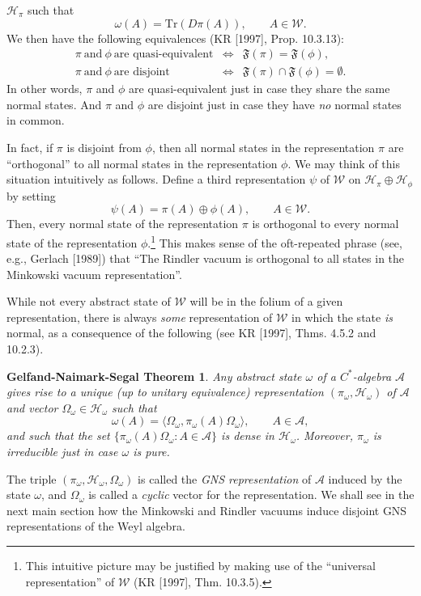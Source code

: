 \documentclass[12pt]{article}
\newtheorem*{gns}{Gelfand-Naimark-Segal Theorem}
\theoremstyle{remark}
\theoremstyle{definition}
\newcommand{\alg}[1]{\mathcal{#1}}
\newcommand{\hil}[1]{\mathcal{#1}}
\begin{document}
$\hil{H}_{\pi}$ such that \begin{equation} \omega (A)=\mathrm{Tr}(D\pi
  (A)) ,\qquad A\in \alg{W} .\end{equation} We then have the following
equivalences (KR [1997], Prop. 10.3.13):
\begin{eqnarray} \nonumber
\pi\ \mbox{and}\ \phi\ \mbox{are quasi-equivalent}  &
 \Longleftrightarrow
& \mathfrak{F}(\pi )=\mathfrak{F}(\phi),  \\ \nonumber
\pi\ \mbox{and}\ \phi\ \mbox{are disjoint} & \Longleftrightarrow & 
\mathfrak{F}(\pi
  )\cap \mathfrak{F}(\phi )=\emptyset. \end{eqnarray} 
\noindent In other words, $\pi$ and $\phi$ are quasi-equivalent just in case
they share the same normal states.  And $\pi$ and $\phi$ are disjoint
just in case they have \emph{no} normal states in common.  

In fact, if $\pi$
is disjoint from $\phi$, then all normal states in the representation
$\pi$ are ``orthogonal'' to all normal states in the representation
$\phi$.  We may think of this situation intuitively as follows.  Define
a third representation $\psi$ of $\alg{W}$ on $\hil{H}_{\pi}\oplus
\hil{H}_{\phi}$ by setting
\begin{equation} \psi (A)=\pi (A)\oplus
  \phi (A) ,\qquad A\in \alg{W} .\end{equation} 
Then, every normal state of the representation $\pi$ is orthogonal to every normal state
of the representation $\phi$.\footnote{This intuitive picture may be
justified by making use of the ``universal representation'' of
$\alg{W}$ (KR [1997], Thm. 10.3.5).}  This makes sense of the oft-repeated 
phrase 
(see, e.g., Gerlach [1989]) 
that ``The Rindler vacuum is orthogonal to all states in the 
Minkowski vacuum representation''. 

While not every abstract state of $\alg{W}$ will be in the folium of a 
given representation, there is always \emph{some} representation of $\alg{W}$ in which 
the state
\emph{is} normal,  as a consequence of the following (see KR [1997],
Thms. 4.5.2 and 10.2.3).
\begin{gns} Any abstract state $\omega$ of a $C^{*}$-algebra
 $\alg{A}$ gives rise to
a unique (up to unitary equivalence) representation $(\pi
_{\omega},\hil{H}_{\omega})$ of $\alg{A}$ and vector $\Omega
_{\omega}\in \hil{H}_{\omega}$ such that
\begin{equation} \omega (A)=\langle \Omega _{\omega},\pi
  _{\omega}(A)\Omega _{\omega} \rangle ,\qquad A\in \alg{A} ,\end{equation}
and such that the set $\{ \pi _{\omega}(A)\Omega _{\omega}:A\in
\alg{A}\}$ is dense in $\hil{H}_{\omega}$.     Moreover, $\pi
_{\omega}$ is irreducible just in case $\omega$ is pure.  
\end{gns}
\noindent The triple $(\pi
_{\omega},\hil{H}_{\omega},\Omega _{\omega})$ is
called the \emph{GNS representation} of $\alg{A}$ induced by the state
$\omega$, and  $\Omega _{\omega}$ is called a \emph{cyclic} vector for 
the representation.   We shall see in the next main section how the Minkowski and Rindler 
vacuums induce disjoint GNS representations of the Weyl algebra.   
\end{document}
